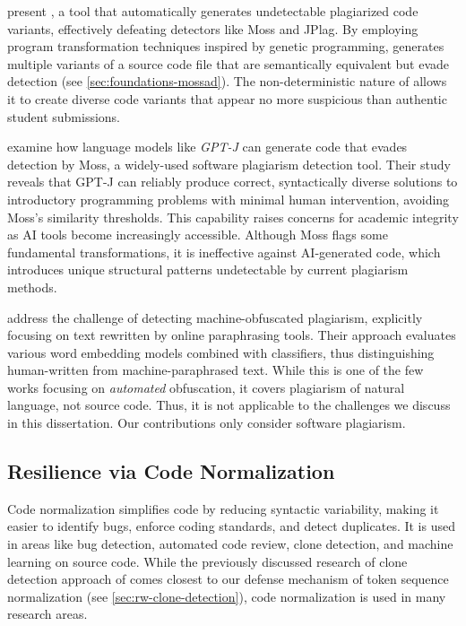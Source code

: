 \citet{DevoreMcDonald2020} present \mossad, a tool that automatically generates undetectable plagiarized code variants, effectively defeating detectors like Moss and JPlag. By employing program transformation techniques inspired by genetic programming, \mossad generates multiple variants of a source code file that are semantically equivalent but evade detection (see \autoref{sec:foundations-mossad}). The non-deterministic nature of \mossad allows it to create diverse code variants that appear no more suspicious than authentic student submissions.

\citet{Biderman2022} examine how language models like \textit{GPT-J} can generate code that evades detection by Moss, a widely-used software plagiarism detection tool. Their study reveals that GPT-J can reliably produce correct, syntactically diverse solutions to introductory programming problems with minimal human intervention, avoiding Moss's similarity thresholds. This capability raises concerns for academic integrity as AI tools become increasingly accessible. Although Moss flags some fundamental transformations, it is ineffective against AI-generated code, which introduces unique structural patterns undetectable by current plagiarism methods.

\citet{Foltynek2020} address the challenge of detecting machine-obfuscated plagiarism, explicitly focusing on text rewritten by online paraphrasing tools. Their approach evaluates various word embedding models combined with classifiers, thus distinguishing human-written from machine-paraphrased text.
%
While this is one of the few works focusing on \textit{automated} obfuscation, it covers plagiarism of natural language, not source code. Thus, it is not applicable to the challenges we discuss in this dissertation. Our contributions only consider software plagiarism.

\subsection{Resilience via Code Normalization}
Code normalization simplifies code by reducing syntactic variability, making it easier to identify bugs, enforce coding standards, and detect duplicates. It is used in areas like bug detection, automated code review, clone detection, and machine learning on source code.
%
While the previously discussed research of clone detection approach of \citet{ly2017} comes closest to our defense mechanism of token sequence normalization (see \autoref{sec:rw-clone-detection}), code normalization is used in many research areas.

